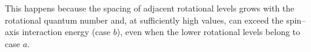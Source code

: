 This happens because the spacing of adjacent rotational levels grows with the rotational quantum number and, at sufficiently high values, can exceed the spin--axis interaction energy (case $b$), even when the lower rotational levels belong to case $a$.
